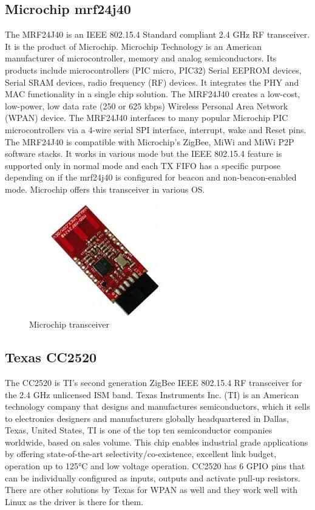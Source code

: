 \subsection{Microchip mrf24j40}
The MRF24J40 is an IEEE 802.15.4 Standard com­pliant 2.4 GHz RF transceiver. It is the product of Microchip. Microchip Technology is an American manufacturer of microcontroller, memory and analog semiconductors. Its products include microcontrollers (PIC micro, PIC32) Serial EEPROM devices, Serial SRAM devices, radio frequency (RF) devices. It integrates the PHY and MAC functionality in a single chip solution. The MRF24J40 creates a low-cost, low-power, low data rate (250 or 625 kbps) Wireless Personal Area Network (WPAN) device. The MRF24J40 interfaces to many popular Microchip PIC microcontrollers via a 4-wire serial SPI interface, interrupt, wake and Reset pins.\\ 
\noindent The MRF24J40 is compatible with Microchip's ZigBee, MiWi and MiWi P2P software stacks. It works in various mode but the IEEE 802.15.4 feature is supported only in normal mode and each TX FIFO has a specific purpose depending on if the mrf24j40 is configured for beacon and non-beacon-enabled mode. Microchip offers this transceiver in various OS. 
\begin{figure}[ht]
	\centering
	\includegraphics[scale=0.8]{images/microchip.jpg}
	\caption{Microchip transceiver}
\end{figure}
\subsection{Texas CC2520}
The CC2520 is TI's second generation ZigBee IEEE 802.15.4 RF transceiver for the 2.4 GHz unlicensed ISM band. Texas Instruments Inc. (TI) is an American technology company that designs and manufactures semiconductors, which it sells to electronics designers and manufacturers globally headquartered in Dallas, Texas, United States, TI is one of the top ten semiconductor companies worldwide, based on sales volume. This chip enables industrial grade applications by offering state-of-the-art selectivity/co-existence, excellent link budget, operation up to 125°C and low voltage operation. CC2520 has 6 GPIO pins that can be individually configured as inputs, outputs and activate pull-up resistors. There are other solutions by Texas for WPAN as well and they work well with Linux as the driver is there for them.

